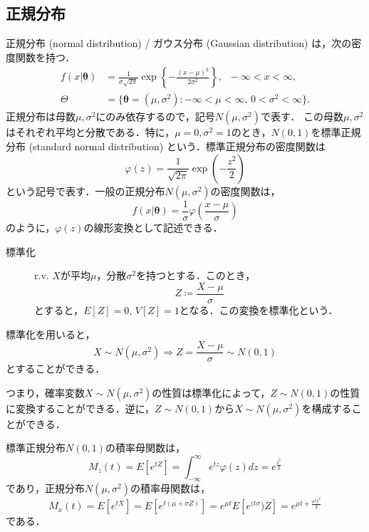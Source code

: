 \documentclass{jsreport}
\begin{document}
\subsection{正規分布}
正規分布 (normal distribution) / ガウス分布 (Gaussian distribution) は，次の密度関数を持つ．
\begin{align}
  f(x | \bm{\theta}) &= \frac{1}{\sigma \sqrt{2\pi}} \exp\left\{- \frac{(x - \mu)^2}{2 \sigma^2} \right\}, \; \; -\infty < x < \infty, \nonumber \\
  \Theta &= \{\bm{\theta} = (\mu, \sigma^2) : -\infty < \mu < \infty, \, 0 < \sigma^2 < \infty\}. \nonumber
\end{align}
正規分布は母数$\mu, \sigma^2$にのみ依存するので，記号$N(\mu, \sigma^2)$で表す．
この母数$\mu, \sigma^2$はそれぞれ平均と分散である．特に，$\mu = 0, \sigma^2 = 1$のとき，$N(0,1)$を標準正規分布 (standard normal distribution) という．標準正規分布の密度関数は
\begin{equation}
  \varphi(z) = \frac{1}{\sqrt{2\pi}} \exp\left(- \frac{z^2}{2}\right) \nonumber
\end{equation}
という記号で表す．一般の正規分布$N(\mu, \sigma^2)$の密度関数は，
\begin{equation}
  f(x | \bm{\theta}) = \frac{1}{\sigma} \varphi\left(\frac{x - \mu}{\sigma}\right) \nonumber
\end{equation}
のように，$\varphi(z)$の線形変換として記述できる．

\begin{description}
  \item[標準化]
  r.v. $X$が平均$\mu$，分散$\sigma^2$を持つとする．このとき，
  \begin{equation}
    Z \coloneqq \frac{X - \mu}{\sigma} \nonumber
  \end{equation}
  とすると，$E[Z] = 0, \, V[Z] = 1$となる．この変換を標準化という．
\end{description}

標準化を用いると，
\begin{equation}
  X \sim N(\mu, \sigma^2) \Longrightarrow Z = \frac{X - \mu}{\sigma} \sim N(0, 1) \nonumber
\end{equation}
とすることができる．

つまり，確率変数$X \sim N(\mu, \sigma^2)$の性質は標準化によって，$Z \sim N(0, 1)$の性質に変換することができる．逆に，$Z \sim N(0, 1)$から$X \sim N(\mu, \sigma^2)$を構成することができる．

標準正規分布$N(0, 1)$の積率母関数は，
\begin{equation}
  M_z(t) = E[e^{tZ}] = \int_{-\infty}^{\infty} e^{tz}\varphi(z)dz = e^{\frac{t^2}{2}} \nonumber
\end{equation}
であり，正規分布$N(\mu, \sigma^2)$の積率母関数は，
\begin{equation}
  M_x(t) = E[e^{tX}] = E[e^{t(\mu + \sigma Z)}] = e^{\mu t} E[e^{(t\sigma})Z] = e^{\mu t + \frac{\sigma^2 t^2}{2}} \nonumber
\end{equation}
である．
\end{document}
